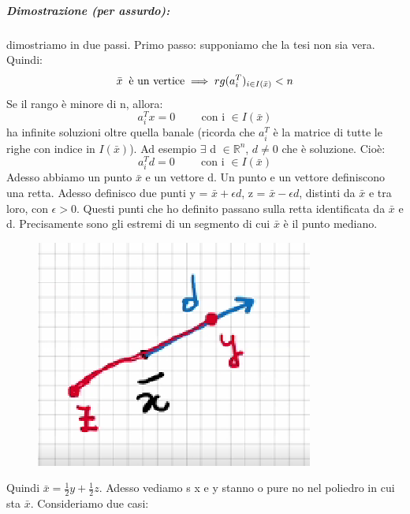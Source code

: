 \subparagraph{Dimostrazione (per assurdo):} dimostriamo in due passi. Primo passo: supponiamo che la tesi non sia vera. Quindi:
\begin{equation*}
    \bar{x} \hspace{0.2cm} \text{è un vertice} \implies rg(a_i^T)_{i\in I(\bar{x})} < n
\end{equation*}
Se il rango è minore di n, allora:
\begin{equation*}
    a_i^Tx  = 0 \hspace{1cm} \text{con i $\in I(\bar{x})$}
\end{equation*}
ha infinite soluzioni oltre quella banale (ricorda che $a_i^T$ è la matrice di tutte le righe con indice in $I(\bar{x})$). Ad esempio $\exists$ d $\in \mathbb{R}^n$, $d \neq 0$ che è soluzione. Cioè:
\begin{equation*}
    a_i^Td = 0  \hspace{1cm} \text{con i $\in I(\bar{x})$}
\end{equation*}
Adesso abbiamo un punto $\bar{x}$ e un vettore d. Un punto e un vettore definiscono una retta. Adesso definisco due punti y = $\bar{x} + \epsilon d$, z = $\bar{x} - \epsilon d$, distinti da $\bar{x}$ e tra loro, con $\epsilon > 0$. Questi punti che ho definito passano sulla retta identificata da $\bar{x}$ e d. Precisamente sono gli estremi di un segmento di cui $\bar{x}$ è il punto mediano.
\begin{figure}[h!]
    \centering
    \includegraphics[scale=0.5]{dimostrazione.png}
\end{figure}
Quindi $\bar{x} = \frac{1}{2}y + \frac{1}{2}z$. Adesso vediamo s x e y stanno o pure no nel poliedro in cui sta $\bar{x}$. Consideriamo due casi:
